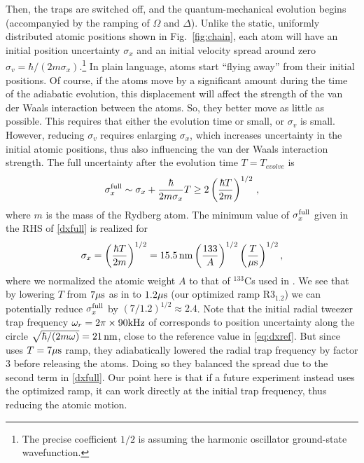 \documentclass[a4paper,11pt]{article}
\newcommand{\beq}{\begin{equation}}
\newcommand{\eeq}{\end{equation}}
\theoremstyle{remark}
\theoremstyle{theorem}
\begin{document}
Then, the traps are switched off, and the quantum-mechanical evolution begins (accompanyied by the ramping of $\Omega$ and $\Delta$). Unlike the static, uniformly distributed atomic positions shown in Fig.~\ref{fig:chain}, each atom will have an initial position uncertainty $\sigma_x$ and an initial velocity spread around zero $\sigma_v= \hbar / (2m \sigma_x)$.\footnote{The precise coefficient $1/2$ is assuming the harmonic oscillator ground-state wavefunction.} In plain language, atoms start ``flying away'' from their initial positions. Of course, if the atoms move by a significant amount during the time of the adiabatic evolution, this displacement will affect the strength of the van der Waals interaction between the atoms. So, they better move as little as possible. This requires that either the evolution time or small, or $\sigma_v$ is small. However, reducing $\sigma_v$ requires enlarging $\sigma_x$, which increases uncertainty in the initial atomic positions, thus also influencing the van der Waals interaction strength. The full uncertainty after the evolution time $T=T_{evolve}$ is
\begin{equation}
	\sigma_x^{\rm full} \sim\sigma_x + \frac{\hbar}{2m \sigma_x } T \ge 2 \left(\frac {\hbar T}{2m}\right)^{1/2}\,,
	\label{dxfull}
\end{equation}
where $m$ is the mass of the Rydberg atom. The minimum value of $\sigma_x^{\rm full}$ given in the RHS of \eqref{dxfull} is realized for
\beq
\sigma_x = \left(\frac {\hbar T}{2m}\right)^{1/2}= 15.5\, {\rm nm} \left (\frac{133}{A}\right)^{1/2} \left (\frac T {\mu{\rm  s}}\right )^{1/2},
\label{eq:dxref}
\eeq
where we normalized the atomic weight $A$ to that of ${}^{133}$Cs used in \cite{Fang:2024uyf}. We see that by lowering $T$ from $7\mu {\rm s}$ as in \cite{Fang:2024uyf} to $1.2\mu {\rm s}$ (our optimized ramp R3$_{1.2}$) we can potentially reduce $\sigma_ x^{\rm full}$ by $(7/1.2)^{1/2}\approx 2.4$. Note that the initial radial tweezer trap frequency $\omega_r=2\pi\times 90 {\rm kHz}$ of \cite{Fang:2024uyf} corresponds to position uncertainty along the circle $\sqrt{\hbar/(2 m\omega)}=21\,{\rm nm}$, close to the reference value in \eqref{eq:dxref}. But since \cite{Fang:2024uyf} uses $T=7\mu{\rm s}$ ramp, they adiabatically lowered the radial trap frequency by factor 3 before releasing the atoms. Doing so they balanced the spread due to the second term in \eqref{dxfull}. Our point here is that if a future experiment instead uses the optimized ramp, it can work directly at the initial trap frequency, thus reducing the atomic motion.
\end{document}
